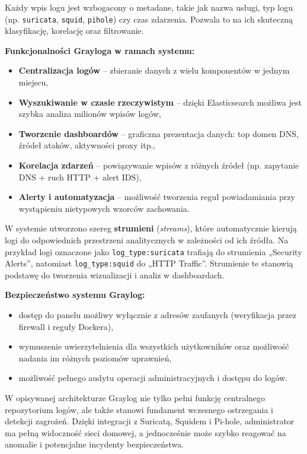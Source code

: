 \documentclass[
    left=2.5cm,         %
    right=2.5cm,        %
    top=2.5cm,          %
    bottom=3cm,         %
    bindingoffset=6mm,  %
    nohyphenation=true %
]{eiti/eiti-thesis} %
\begin{document}
Każdy wpis logu jest wzbogacony o metadane, takie jak nazwa usługi, typ logu (np. \texttt{suricata}, \texttt{squid}, \texttt{pihole}) czy czas zdarzenia. Pozwala to na ich skuteczną klasyfikację, korelację oraz filtrowanie.

\textbf{Funkcjonalności Grayloga w ramach systemu:}
\begin{itemize}
    \item \textbf{Centralizacja logów} – zbieranie danych z wielu komponentów w jednym miejscu,
    \item \textbf{Wyszukiwanie w czasie rzeczywistym} – dzięki Elasticsearch możliwa jest szybka analiza milionów wpisów logów,
    \item \textbf{Tworzenie dashboardów} – graficzna prezentacja danych: top domen DNS, źródeł ataków, aktywności proxy itp.,
    \item \textbf{Korelacja zdarzeń} – powiązywanie wpisów z różnych źródeł (np. zapytanie DNS + ruch HTTP + alert IDS),
    \item \textbf{Alerty i automatyzacja} – możliwość tworzenia reguł powiadamiania przy wystąpieniu nietypowych wzorców zachowania.
\end{itemize}

W systemie utworzono szereg \textbf{strumieni} (\textit{streams}), które automatycznie kierują logi do odpowiednich przestrzeni analitycznych w zależności od ich źródła. Na przykład logi oznaczone jako \texttt{log\_type:suricata} trafiają do strumienia „Security Alerts”, natomiast \texttt{log\_type:squid} do „HTTP Traffic”. Strumienie te stanowią podstawę do tworzenia wizualizacji i analiz w dashboardach.

\textbf{Bezpieczeństwo systemu Graylog:}
\begin{itemize}
    \item dostęp do panelu możliwy wyłącznie z adresów zaufanych (weryfikacja przez firewall i reguły Dockera),
    \item wymuszenie uwierzytelnienia dla wszystkich użytkowników oraz możliwość nadania im różnych poziomów uprawnień,
    \item możliwość pełnego audytu operacji administracyjnych i dostępu do logów.
\end{itemize}

W opisywanej architekturze Graylog nie tylko pełni funkcję centralnego repozytorium logów, ale także stanowi fundament wczesnego ostrzegania i detekcji zagrożeń. Dzięki integracji z Suricatą, Squidem i Pi-hole, administrator ma pełną widoczność sieci domowej, a jednocześnie może szybko reagować na anomalie i potencjalne incydenty bezpieczeństwa.
\end{document}
